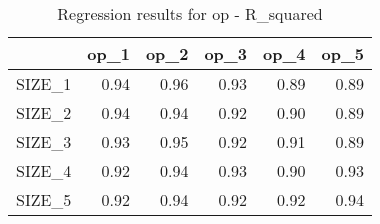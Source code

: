 \begin{table}[ht]
\centering
\caption{Regression results for op - R_squared} 
\begin{tabular}{rrrrrr}
  \hline
 & op\_1 & op\_2 & op\_3 & op\_4 & op\_5 \\ 
  \hline
SIZE\_1 & 0.94 & 0.96 & 0.93 & 0.89 & 0.89 \\ 
  SIZE\_2 & 0.94 & 0.94 & 0.92 & 0.90 & 0.89 \\ 
  SIZE\_3 & 0.93 & 0.95 & 0.92 & 0.91 & 0.89 \\ 
  SIZE\_4 & 0.92 & 0.94 & 0.93 & 0.90 & 0.93 \\ 
  SIZE\_5 & 0.92 & 0.94 & 0.92 & 0.92 & 0.94 \\ 
   \hline
\end{tabular}
\end{table}


